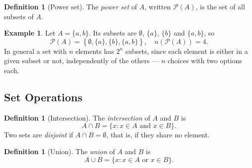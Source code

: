 \documentclass[11pt,a4paper]{article}
\theoremstyle{definition}
\newtheorem{definition}[thm]{Definition}
\newtheorem{example}[thm]{Example}
\begin{document}
\begin{definition}[Power set]
The \emph{power set} of $A$, written $\mathcal{P}(A)$, is the set of all subsets of
$A$.
\end{definition}

\begin{example}
Let $A=\{a,b\}$. Its subsets are $\emptyset$, $\{a\}$, $\{b\}$ and $\{a,b\}$, so
$$\mathcal{P}(A)=\left\{\emptyset,\{a\},\{b\},\{a,b\}\right\},
\quad  n\left(\mathcal{P}(A)\right)=4 .$$
In general a set with $n$ elements has $2^{n}$ subsets, since each element is
either in a given subset or not, independently of the others --- $n$ choices with
two options each.
\end{example}

\pagebreak
\subsection{Set Operations}

\begin{definition}[Intersection]
The \emph{intersection} of $A$ and $B$ is
$$A\cap B=\{x : x\in A \text{ and } x\in B\}.$$
Two sets are \emph{disjoint} if $A\cap B=\emptyset$, that is, if they share no
element.
\end{definition}

\begin{figure}[H]
\centering
{}
\end{figure}

\begin{definition}[Union]
The \emph{union} of $A$ and $B$ is
$$A\cup B=\{x : x\in A \text{ or } x\in B\}.$$
\end{definition}

\begin{figure}[H]
\centering
{}
\end{figure}
\end{document}
